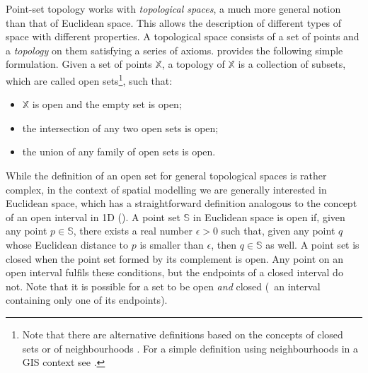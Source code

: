 Point-set topology works with \emph{topological spaces}, a much more general notion than that of Euclidean space.
This allows the description of different types of space with different properties.
A topological space consists of a set of points and a \emph{topology} on them satisfying a series of axioms.
\citet{Edelsbrunner14} provides the following simple formulation.
Given a set of points $\mathbb{X}$, a topology of $\mathbb{X}$ is a collection of subsets, which are called open sets\footnote{Note that there are alternative definitions based on the concepts of closed sets or of neighbourhoods \citep{Hausdorff14}. For a simple definition using neighbourhoods in a GIS context see \citet[\S{}3.2.2]{Worboys04}.}, such that:
\begin{itemize}
\item $\mathbb{X}$ is open and the empty set is open;
\item the intersection of any two open sets is open;
\item the union of any family of open sets is open.
\end{itemize}

While the definition of an open set for general topological spaces is rather complex, in the context of spatial modelling we are generally interested in Euclidean space, which has a straightforward definition analogous to the concept of an open interval in 1D ().
A point set $\mathbb{S}$ in Euclidean space is open if, given any point $p \in \mathbb{S}$, there exists a real number $\epsilon > 0$ such that, given any point $q$ whose Euclidean distance to $p$ is smaller than $\epsilon$, then $q \in \mathbb{S}$ as well.
A point set is closed when the point set formed by its complement is open.
Any point on an open interval fulfils these conditions, but the endpoints of a closed interval do not.
Note that it is possible for a set to be open \emph{and} closed (\eg\ an interval containing only one of its endpoints).

